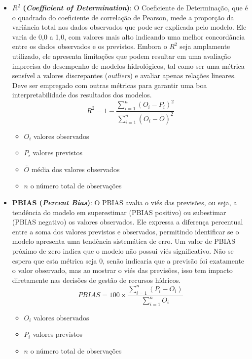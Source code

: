 \begin{itemize}
	\item \textbf{$R^2$ (\textit{Coefficient of Determination})}: O Coeficiente de Determinação, que é o quadrado do coeficiente de correlação de Pearson, mede a proporção da variância total nos dados observados que pode ser explicada pelo modelo. Ele varia de 0,0 a 1,0, com valores mais alto indicando uma melhor concordância entre os dados observados e os previstos. Embora o $R^2$ seja amplamente utilizado, ele apresenta limitações que podem resultar em uma avaliação imprecisa do desempenho de modelos hidrológicos, tal como ser uma métrica sensível a valores discrepantes (\textit{outliers}) e avaliar apenas relações lineares. Deve ser empregado com outras métricas para garantir uma boa interpretabilidade dos resultados dos modelos.\cite{legates1999goodness}
	\begin{equation}
		R^2 = 1 - \frac{\sum_{i=1}^{n} (O_i - {P_i})^2}{\sum_{i=1}^{n} (O_i - \bar{O})^2}
	\end{equation}
	\begin{itemize}
		\item $O_i$ valores observados
		\item $P_i$ valores previstos
		\item $\bar{O}$ média dos valores observados
		\item $n$ o número total de observações
	\end{itemize}
	
	\item \textbf{PBIAS (\textit{Percent Bias})}: O PBIAS avalia o viés das previsões, ou seja, a tendência do modelo em superestimar (PBIAS positivo) ou subestimar (PBIAS negativo) os valores observados. Ele expressa a diferença percentual entre a soma dos valores previstos e observados, permitindo identificar se o modelo apresenta uma tendência sistemática de erro. Um valor de PBIAS próximo de zero indica que o modelo não possui viés significativo. Não se espera que esta métrica seja 0, senão indicaria que a previsão foi exatamente o valor observado, mas ao mostrar o viés das previsões, isso tem impacto diretamente nas decisões de gestão de recursos hídricos.\cite{rayyan-33388455}
	\begin{equation}
		PBIAS = 100 \times \frac{\sum_{i=1}^{n} (P_i - O_i)}{\sum_{i=1}^{n} O_i}
	\end{equation}
	\begin{itemize}
		\item $O_i$ valores observados
		\item $P_i$ valores previstos
		\item $n$ o número total de observações
	\end{itemize}
	

\end{itemize}
